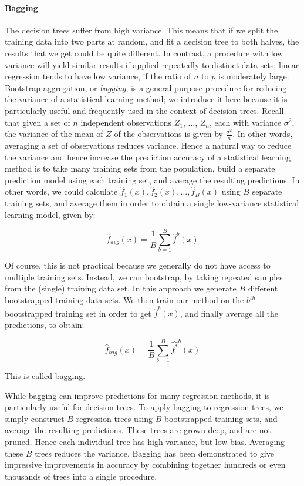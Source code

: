 \paragraph{Bagging}
The decision trees suffer from high variance. This means that if we split the training data into two
parts at random, and fit a decision tree to both halves, the results that we get could be quite
different. In contrast, a procedure with low variance will yield similar results if applied
repeatedly to distinct data sets; linear regression tends to have low variance, if the ratio of $n$
to $p$ is moderately large. Bootstrap aggregation, or \textit{bagging}, is a general-purpose
procedure for reducing the variance of a statistical learning method; we introduce it here because
it is particularly useful and frequently used in the context of decision trees. Recall that given a
set of $n$ independent observations $Z_1$, ..., $Z_n$, each with variance $\sigma^2$, the variance
of the mean of $Z$ of the observations is given by $\frac{\sigma^2}{n}$. In other words, averaging a
set of observations reduces variance. Hence a natural way to reduce the variance and hence increase
the prediction accuracy of a statistical learning method is to take many training sets from the
population, build a separate prediction model using each training set, and average the resulting
predictions. In other words, we could calculate $\hat{f}_1(x), \hat{f}_2(x), ..., \hat{f}_B(x)$
using $B$ separate training sets, and average them in order to obtain a single low-variance
statistical learning model, given by:

$$\hat{f}_{avg}(x) = \frac{1}{B} \sum_{b=1}^{B} \hat{f}^b(x)$$

Of course, this is not practical because we generally do not have access to multiple training sets.
Instead, we can bootstrap, by taking repeated samples from the (single) training data set. In this
approach we generate $B$ different bootstrapped training data sets. We then train our method on the
$b^{th}$ bootstrapped training set in order to get $\hat{f}^b(x)$, and finally average all the
predictions, to obtain:

$$\hat{f}_{bag}(x) = \frac{1}{B} \sum_{b=1}^{B} \hat{f^*}^b(x)$$

This is called bagging.

While bagging can improve predictions for many regression methods, it is particularly useful for
decision trees. To apply bagging to regression trees, we simply construct $B$ regression trees using
$B$ bootstrapped training sets, and average the resulting predictions. These trees are grown deep,
and are not pruned. Hence each individual tree has high variance, but low bias. Averaging these $B$
trees reduces the variance. Bagging has been demonstrated to give impressive improvements in
accuracy by combining together hundreds or even thousands of trees into a single procedure.

